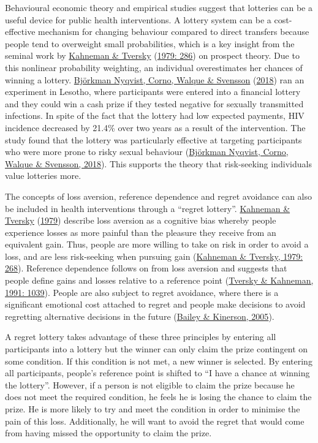 \documentclass[11pt,preprint, authoryear]{elsarticle}
\numberwithin{equation}{section}
\numberwithin{figure}{section}
\numberwithin{table}{section}
\begin{document}
Behavioural economic theory and empirical studies suggest that lotteries
can be a useful device for public health interventions. A lottery system
can be a cost-effective mechanism for changing behaviour compared to
direct transfers because people tend to overweight small probabilities,
which is a key insight from the seminal work by
\protect\hyperlink{ref-prospect}{Kahneman \& Tversky}
(\protect\hyperlink{ref-prospect}{1979: 286}) on prospect theory. Due to
this nonlinear probability weighting, an individual overestimates her
chances of winning a lottery. \protect\hyperlink{ref-hiv}{Björkman
Nyqvist, Corno, Walque \& Svensson} (\protect\hyperlink{ref-hiv}{2018})
ran an experiment in Lesotho, where participants were entered into a
financial lottery and they could win a cash prize if they tested
negative for sexually transmitted infections. In spite of the fact that
the lottery had low expected payments, HIV incidence decreased by 21.4\%
over two years as a result of the intervention. The study found that the
lottery was particularly effective at targeting participants who were
more prone to risky sexual behaviour
(\protect\hyperlink{ref-hiv}{Björkman Nyqvist, Corno, Walque \&
Svensson, 2018}). This supports the theory that risk-seeking individuals
value lotteries more.

The concepts of loss aversion, reference dependence and regret avoidance
can also be included in health interventions through a ``regret
lottery''. \protect\hyperlink{ref-prospect}{Kahneman \& Tversky}
(\protect\hyperlink{ref-prospect}{1979}) describe loss aversion as a
cognitive bias whereby people experience losses as more painful than the
pleasure they receive from an equivalent gain. Thus, people are more
willing to take on risk in order to avoid a loss, and are less
risk-seeking when pursuing gain
(\protect\hyperlink{ref-prospect}{Kahneman \& Tversky, 1979: 268}).
Reference dependence follows on from loss aversion and suggests that
people define gains and losses relative to a reference point
(\protect\hyperlink{ref-ref}{Tversky \& Kahneman, 1991: 1039}). People
are also subject to regret avoidance, where there is a significant
emotional cost attached to regret and people make decisions to avoid
regretting alternative decisions in the future
(\protect\hyperlink{ref-regret}{Bailey \& Kinerson, 2005}).

A regret lottery takes advantage of these three principles by entering
all participants into a lottery but the winner can only claim the prize
contingent on some condition. If this condition is not met, a new winner
is selected. By entering all participants, people's reference point is
shifted to ``I have a chance at winning the lottery''. However, if a
person is not eligible to claim the prize because he does not meet the
required condition, he feels he is losing the chance to claim the prize.
He is more likely to try and meet the condition in order to minimise the
pain of this loss. Additionally, he will want to avoid the regret that
would come from having missed the opportunity to claim the prize.
\end{document}
